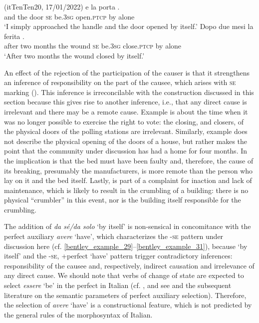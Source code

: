 \documentclass[output=paper,colorlinks,citecolor=brown
]{langscibook}
\begin{document}
\ea \label{bentley_example_33}(itTenTen20, 17/01/2022)
    \ea \label{bentley_example_33a}
     	e				la		porta														 .	\\
    {} and	the	door		\textsc{se}		be.3\textsc{sg}		open.\textsc{ptcp}	by	alone \\
    \glt 					‘I simply approached the handle and the door opened by itself.’
    \ex \label{bentley_example_33b}
    \gll Dopo		due	mesi			la		ferita			 								 			 . \\
				after			two	months	the	wound		\textsc{se}		be.3\textsc{sg}		close.\textsc{ptcp}	by	alone\\
    \glt 				‘After two months the wound closed by itself.’
    \z
\z

An effect of the rejection of the participation of the causer is that it strengthens an inference of responsibility on the part of the causee, which arises with \textsc{se} marking (\cites[and references therein]{zribi1987reflexivite}[]{kailuweit2012construcciones}[see  for further discussion]{martin2014anticausatives}). This inference is irreconcilable with the construction discussed in this section because this gives rise to another inference, i.e., that any direct cause is irrelevant and there may be a remote cause. Example  is about the time when it was no longer possible to exercise the right to vote: the closing, and closers, of the physical doors of the polling stations are irrelevant. Similarly, example  does not describe the physical opening of the doors of a house, but rather makes the point that the community under discussion has had a home for four months. In  the implication is that the bed must have been faulty and, therefore, the cause of its breaking, presumably the manufacturers, is more remote than the person who lay on it and the bed itself. Lastly,  is part of a complaint for inaction and lack of maintenance, which is likely to result in the crumbling of a building: there is no physical “crumbler” in this event, nor is the building itself responsible for the crumbling.

The addition of\textit{ da sé/da solo} ‘by itself’ is non-sensical in concomitance with the perfect
auxiliary \textit{avere} ‘have’, which characterizes the -\textsc{se} pattern under discussion here
(cf. \ref{bentley_example_29}--\ref{bentley_example_31}), because ‘by itself’ and the {-\textsc{se}, +perfect ‘have’} pattern trigger contradictory inferences: responsibility of the causee and, respectively, indirect causation and irrelevance of any direct cause. We should note that verbs of change of state are expected to select \textit{essere} ‘be’ in the perfect in Italian (cf. ,  and see \cite{perlmutter1989multiattachment} and the subsequent literature on the semantic parameters of perfect auxiliary selection). Therefore, the selection of \textit{avere }‘have’ is a constructional feature, which is not predicted by the general rules of the morphosyntax of Italian.
\end{document}
